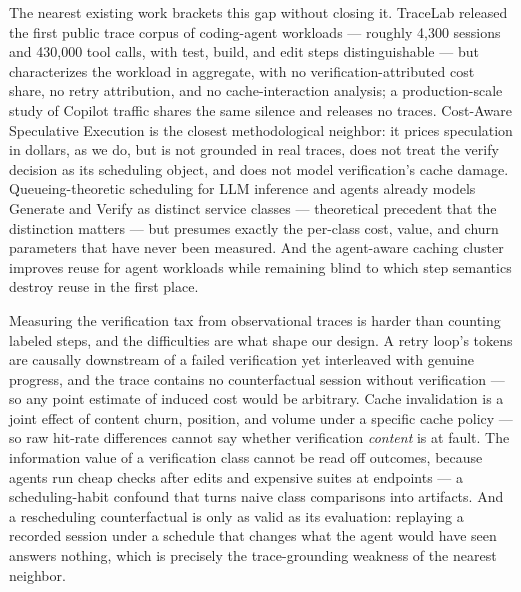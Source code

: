 \documentclass[11pt]{article}
\begin{document}
The nearest existing work brackets this gap without closing it. TraceLab \citep{TraceLab2606} released the first public trace corpus of coding-agent workloads --- roughly 4{,}300 sessions and 430{,}000 tool calls, with test, build, and edit steps distinguishable --- but characterizes the workload in aggregate, with no verification-attributed cost share, no retry attribution, and no cache-interaction analysis; a production-scale study of Copilot traffic \citep{CopilotScale2608} shares the same silence and releases no traces. Cost-Aware Speculative Execution \citep{CostAwareSpec2606} is the closest methodological neighbor: it prices speculation in dollars, as we do, but is not grounded in real traces, does not treat the verify decision as its scheduling object, and does not model verification's cache damage. Queueing-theoretic scheduling for LLM inference and agents \citep{Dai2025Queueing} already models Generate and Verify as distinct service classes --- theoretical precedent that the distinction matters --- but presumes exactly the per-class cost, value, and churn parameters that have never been measured. And the agent-aware caching cluster \citep{Pan2025KVFlow,Irminsul2605} improves reuse for agent workloads while remaining blind to which step semantics destroy reuse in the first place.

Measuring the verification tax from observational traces is harder than counting labeled steps, and the difficulties are what shape our design. A retry loop's tokens are causally downstream of a failed verification yet interleaved with genuine progress, and the trace contains no counterfactual session without verification --- so any point estimate of induced cost would be arbitrary. Cache invalidation is a joint effect of content churn, position, and volume under a specific cache policy --- so raw hit-rate differences cannot say whether verification \emph{content} is at fault. The information value of a verification class cannot be read off outcomes, because agents run cheap checks after edits and expensive suites at endpoints --- a scheduling-habit confound that turns naive class comparisons into artifacts. And a rescheduling counterfactual is only as valid as its evaluation: replaying a recorded session under a schedule that changes what the agent would have seen answers nothing, which is precisely the trace-grounding weakness of the nearest neighbor.
\end{document}
